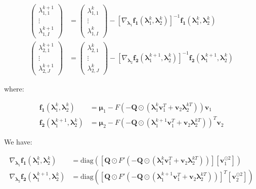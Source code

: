 \documentclass{tex/note}
\begin{document}
\begin{align*}
\begin{pmatrix} \lambda_{1,1}^{k + 1} \\ \vdots \\ \lambda_{1,I}^{k + 1} \end{pmatrix} &= \begin{pmatrix} \lambda_{1,1}^k \\ \vdots \\ \lambda_{1,I}^k \end{pmatrix} - \left[ \nabla_{\bm{\lambda}_1} \bm{f_1} \left( \bm{\lambda}_1^k , \bm{\lambda}_2^k \right) \right] ^{-1} \bm{f_1} \left( \bm{\lambda}_1^k , \bm{\lambda}_2^k \right) \\
\begin{pmatrix} \lambda_{2,1}^{k + 1} \\ \vdots \\ \lambda_{2,J}^{k + 1} \end{pmatrix} &= \begin{pmatrix} \lambda_{2,1}^k \\ \vdots \\ \lambda_{2,J}^k \end{pmatrix} - \left[ \nabla_{\bm{\lambda}_2} \bm{f_2} \left( \bm{\lambda}_1^{k+1} , \bm{\lambda}_2^k \right) \right] ^{-1} \bm{f_2} \left( \bm{\lambda}_1^{k+1} , \bm{\lambda}_2^k \right)
\end{align*}

where:

\begin{align*}
\bm{f_1} \left( \bm{\lambda}_1^k , \bm{\lambda}_2^k \right) &= \bm{\mu}_1 - F \left( - \bm{Q} \odot \left( \bm{\lambda}_1^k \bm{v}_1^T + \bm{v}_2 \bm{\lambda}_2^{k T} \right) \right) \bm{v}_1 \\
\bm{f_2} \left( \bm{\lambda}_1^{k+1} , \bm{\lambda}_2^k \right) &= \bm{\mu}_2 - F \left( - \bm{Q} \odot \left( \bm{\lambda}_1^{k+1} \bm{v}_1^T + \bm{v}_2 \bm{\lambda}_2^{k T} \right) \right)^T \bm{v}_2
\end{align*}

We have:

\begin{align*}
\nabla_{\bm{\lambda}_1} \bm{f_1} \left( \bm{\lambda}_1^k , \bm{\lambda}_2^k \right) &= \text{diag} \left( \left[ \bm{Q} \odot F' \left( - \bm{Q} \odot \left( \bm{\lambda}_1^k \bm{v}_1^T + \bm{v}_2 \bm{\lambda}_2^{k T} \right) \right) \right] \left[ \bm{v}_1^{\odot 2} \right] \right) \\
\nabla_{\bm{\lambda}_2} \bm{f_2} \left( \bm{\lambda}_1^{k + 1} , \bm{\lambda}_2^k \right) &= \text{diag} \left( \left[ \bm{Q} \odot F' \left( - \bm{Q} \odot \left( \bm{\lambda}_1^{k + 1} \bm{v}_1^T + \bm{v}_2 \bm{\lambda}_2^{k T} \right) \right) \right]^T \left[ \bm{v}_2^{\odot 2} \right] \right)
\end{align*}
\end{document}
